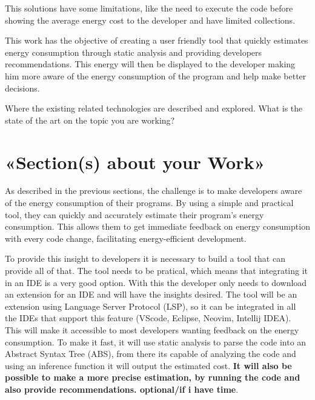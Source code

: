 \documentclass[sigplan]{acmart}
\begin{document}
This solutions have some limitations, like the need to execute the code before showing the average energy cost to the developer and have limited collections.

This work has the objective of creating a user friendly tool that quickly estimates energy consumption through static analysis and providing developers recommendations. This energy will then be displayed to the developer making him more aware of the energy consumption of the program and help make better decisions.




% 

Where the existing related technologies are described and explored. What is the state of the art on the topic you are working? 

\section{«Section(s) about your Work»} \label{sec:work1}

As described in the previous sections, the challenge is to make developers aware of the energy consumption of their programs. By using a simple and practical tool, they can quickly and accurately estimate their program's energy consumption. This allows them to get immediate feedback on energy consumption with every code change, facilitating energy-efficient development.

To provide this insight to developers it is necessary to build a tool that can provide all of that. The tool needs to be pratical, which means that integrating it in an IDE is a very good option. With this the developer only needs to download an extension for an IDE and will have the insights desired.
The tool will be an extension using Language Server Protocol (LSP), so it can be integrated in all the IDEs that support this feature (VScode, Eclipse, Neovim, Intellij IDEA). This will make it accessible to most developers wanting feedback on the energy consumption. To make it fast, it will use static analysis to parse the code into an Abstract Syntax Tree (ABS), from there its capable of analyzing the code and using an inference function it will output the estimated cost. \textbf{It will also be possible to make a more precise estimation, by running the code and also provide recommendations. optional/if i have time}.
\end{document}
